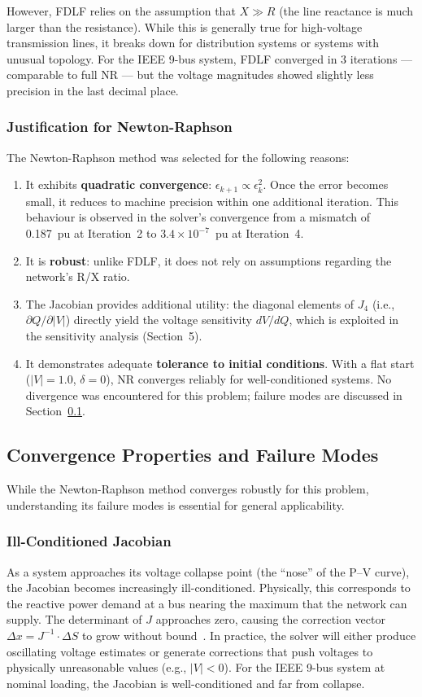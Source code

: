 \documentclass[12pt, a4paper]{article}
\begin{document}
However, FDLF relies on the assumption that $X \gg R$ (the line reactance is much larger than the resistance). While this is generally true for high-voltage transmission lines, it breaks down for distribution systems or systems with unusual topology. For the IEEE 9-bus system, FDLF converged in 3 iterations --- comparable to full NR --- but the voltage magnitudes showed slightly less precision in the last decimal place.

\subsubsection{Justification for Newton-Raphson}
The Newton-Raphson method was selected for the following reasons:
\begin{enumerate}
    \item It exhibits \textbf{quadratic convergence}: $\epsilon_{k+1} \propto \epsilon_k^2$. Once the error becomes small, it reduces to machine precision within one additional iteration. This behaviour is observed in the solver's convergence from a mismatch of 0.187~pu at Iteration~2 to $3.4 \times 10^{-7}$~pu at Iteration~4.
    \item It is \textbf{robust}: unlike FDLF, it does not rely on assumptions regarding the network's R/X ratio.
    \item The Jacobian provides additional utility: the diagonal elements of $J_4$ (i.e., $\partial Q / \partial |V|$) directly yield the voltage sensitivity $dV/dQ$, which is exploited in the sensitivity analysis (Section~5).
    \item It demonstrates adequate \textbf{tolerance to initial conditions}. With a flat start ($|V|=1.0$, $\delta=0$), NR converges reliably for well-conditioned systems. No divergence was encountered for this problem; failure modes are discussed in Section~\ref{sec:convergence_discussion}.
\end{enumerate}

\subsection{Convergence Properties and Failure Modes}
\label{sec:convergence_discussion}
While the Newton-Raphson method converges robustly for this problem, understanding its failure modes is essential for general applicability.

\subsubsection{Ill-Conditioned Jacobian}
As a system approaches its voltage collapse point (the ``nose'' of the P--V curve), the Jacobian becomes increasingly ill-conditioned. Physically, this corresponds to the reactive power demand at a bus nearing the maximum that the network can supply. The determinant of $J$ approaches zero, causing the correction vector $\Delta x = J^{-1} \cdot \Delta S$ to grow without bound~\cite{saadat}. In practice, the solver will either produce oscillating voltage estimates or generate corrections that push voltages to physically unreasonable values (e.g., $|V| < 0$). For the IEEE 9-bus system at nominal loading, the Jacobian is well-conditioned and far from collapse.
\end{document}
